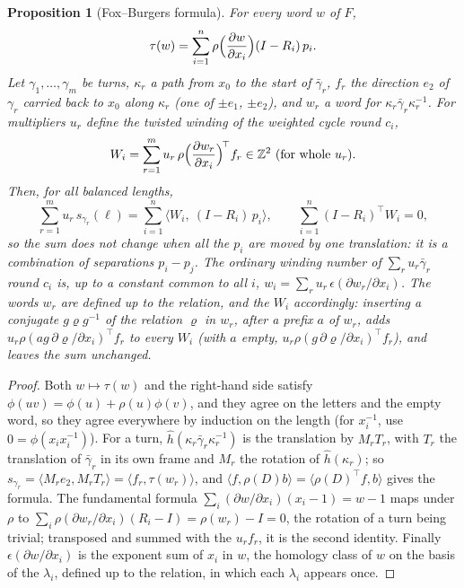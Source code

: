 \documentclass[11pt,a4paper]{article}
\newtheorem{proposition}{Proposition}
\newcommand{\Z}{\mathbb{Z}}
\newcommand{\shift}{s}
\begin{document}
\begin{proposition}[Fox--Burgers formula]\label{prop:fox}
For every word $w$ of $F$,
\[
  \tau(w) = \sum_{i=1}^n \rho\Bigl(\frac{\partial w}{\partial x_i}\Bigr)
  (I - R_i)\,p_i .
\]
Let $\gamma_1, \dots, \gamma_m$ be turns, $\kappa_r$ a path from $x_0$ to the
start of $\bar\gamma_r$, $f_r$ the direction $e_2$ of $\gamma_r$ carried back
to $x_0$ along $\kappa_r$ (one of $\pm e_1$, $\pm e_2$), and $w_r$ a word for
$\kappa_r \bar\gamma_r \kappa_r^{-1}$. For multipliers $u_r$ define the
\emph{twisted winding} of the weighted cycle round $c_i$,
\[
  W_i = \sum_{r=1}^m u_r\, \rho\Bigl(\frac{\partial w_r}{\partial x_i}\Bigr)^{\!\top} f_r
  \in \Z^2 \text{ (for whole } u_r) .
\]
Then, for all balanced lengths,
\[
  \sum_{r=1}^m u_r\, \shift_{\gamma_r}(\ell) = \sum_{i=1}^n \bigl\langle W_i,\
  (I - R_i)\,p_i \bigr\rangle ,
  \qquad
  \sum_{i=1}^n (I - R_i)^\top W_i = 0 ,
\]
so the sum does not change when all the $p_i$ are moved by one translation: it
is a combination of separations $p_i - p_j$. The ordinary winding number of
$\sum_r u_r \bar\gamma_r$ round $c_i$ is, up to a constant common to all $i$,
$w_i = \sum_r u_r\, \epsilon(\partial w_r/\partial x_i)$. The words $w_r$ are
defined up to the relation, and the $W_i$ accordingly: inserting a conjugate
$g\varrho g^{-1}$ of the relation $\varrho$ in $w_r$, after a prefix $a$ of
$w_r$, adds $u_r \rho(a g\, \partial \varrho/\partial x_i)^\top f_r$ to every
$W_i$ (with $a$ empty, $u_r \rho(g\, \partial \varrho/\partial x_i)^\top f_r$),
and leaves the sum unchanged.
\end{proposition}

\begin{proof}
Both $w \mapsto \tau(w)$ and the right-hand side satisfy $\phi(uv) = \phi(u) +
\rho(u)\phi(v)$, and they agree on the letters and the empty word, so they
agree everywhere by induction on the length (for $x_i^{-1}$, use $0 =
\phi(x_i x_i^{-1})$). For a turn, $\hat h(\kappa_r \bar\gamma_r
\kappa_r^{-1})$ is the translation by $M_r T_r$, with $T_r$ the translation of
$\bar\gamma_r$ in its own frame and $M_r$ the rotation of $\hat h(\kappa_r)$;
so $\shift_{\gamma_r} = \langle M_r e_2, M_r T_r \rangle = \langle f_r,
\tau(w_r) \rangle$, and $\langle f, \rho(D) b\rangle = \langle \rho(D)^\top f,
b \rangle$ gives the formula. The fundamental formula $\sum_i (\partial
w/\partial x_i)(x_i - 1) = w - 1$ maps under $\rho$ to $\sum_i \rho(\partial
w_r/\partial x_i)(R_i - I) = \rho(w_r) - I = 0$, the rotation of a turn being
trivial; transposed and summed with the $u_r f_r$, it is the second identity.
Finally $\epsilon(\partial w/\partial x_i)$ is the exponent sum of $x_i$ in
$w$, the homology class of $w$ on the basis of the $\lambda_i$, defined up to
the relation, in which each $\lambda_i$ appears once.
\end{proof}
\end{document}
